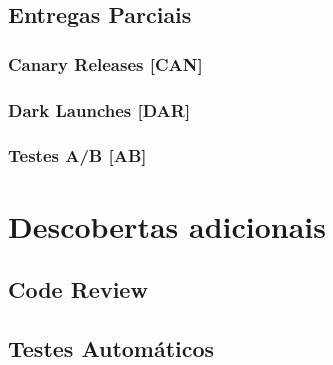 \subsection{Entregas Parciais}
\subsubsection{Canary Releases [CAN]}
\subsubsection{Dark Launches [DAR]}
\subsubsection{Testes A/B [AB]}

\section{Descobertas adicionais}
\subsection{Code Review}
\subsection{Testes Automáticos}
